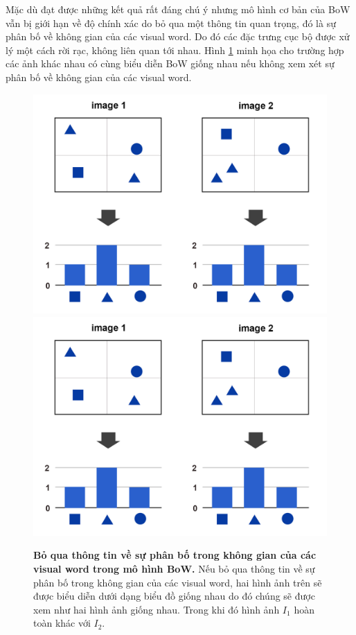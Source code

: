 Mặc dù đạt được những kết quả rất đáng chú ý nhưng mô hình cơ bản của BoW vẫn bị giới hạn về độ chính xác do bỏ qua một thông tin quan trọng, đó là sự phân bố về không gian của các visual word. Do đó các đặc trưng cục bộ được xử lý một cách rời rạc, không liên quan tới nhau. Hình \ref{FigLimited} minh họa cho trường hợp các ảnh khác nhau có cùng biểu diễn BoW giống nhau nếu không xem xét sự phân bố về không gian của các visual word.
\begin{figure}[!htbp]
  \begin{center}
    \leavevmode
    \ifpdf
      \includegraphics[scale=0.25]{limited}
    \else
      \includegraphics[scale=0.25]{limited}
    \fi
    \caption[Bỏ qua thông tin về sự phân bố trong không gian của các visual word trong mô hình BoW]{\textbf{Bỏ qua thông tin về sự phân bố trong không gian của các visual word trong mô hình BoW.} Nếu bỏ qua thông tin về sự phân bố trong không gian của các visual word, hai hình ảnh trên sẽ được biểu diễn dưới dạng biểu đồ giống nhau do đó chúng sẽ được xem như hai hình ảnh giống nhau. Trong khi đó hình ảnh $I_1$ hoàn toàn khác với $I_2$.}
    \label{FigLimited}
  \end{center}
\end{figure}

